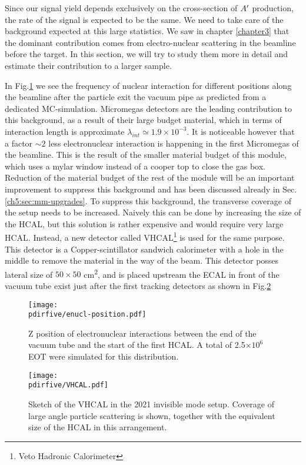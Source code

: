 Since our signal yield depends exclusively on the cross-section of $A'$ production, the rate of the signal is expected to be the same. We need to take care of the background expected at this large statistics. We saw in chapter \ref{chapter3} that the dominant contribution comes from electro-nuclear scattering in the beamline before the target. In this section, we will try to study them more in detail and estimate their contribution to a larger sample.

In Fig.\ref{fig:enucl-position} we see the frequency of nuclear interaction for different positions along the beamline after the particle exit the vacuum pipe as predicted from a dedicated MC-simulation. Micromegas detectors are the leading contribution to this background, as a result of their large budget material, which in terms of interaction length is approximate $\lambda_{int} \simeq 1.9 \times 10^{-3}$. It is noticeable however that a factor $\sim 2$ less electronuclear interaction is happening in the first Micromegas of the beamline. This is the result of the smaller material budget of this module, which uses a mylar window instead of a cooper top to close the gas box. Reduction of the material budget of the rest of the module will be an important improvement to suppress this background and has been discussed already in Sec.\ref{ch5:sec:mm-upgrades}. To suppress this background, the transverse coverage of the setup needs to be increased. Naively this can be done by increasing the size of the HCAL, but this solution is rather expensive and would require very large HCAL. Instead, a new detector called VHCAL\footnote{Veto Hadronic Calorimeter} is used for the same purpose. This detector is a Copper-scintillator sandwich calorimeter with a hole in the middle to remove the material in the way of the beam. This detector posses lateral size of $50\times50$ \si{\centi\meter\squared}, and is placed upstream the ECAL in front of the vacuum tube exist just after the first tracking detectors as shown in Fig.\ref{fig:vhcal}

\begin{figure}[bth!]
  \centering
  \texttt{[image: \\pdirfive/enucl-position.pdf]}
  \caption[electronuclear interaction position]{Z position of electronuclear interactions between the end of the vacuum tube and the start of the first HCAL. A total of 2.5$\times 10^6$ EOT were simulated for this distribution.}
  \label{fig:enucl-position}
\end{figure}

\begin{figure}[bth!]
  \centering
  \texttt{[image: \\pdirfive/VHCAL.pdf]}
  \caption[Sketch of VHCAL in invisible mode setup 2021]{Sketch of the VHCAL in the 2021 invisible mode setup. Coverage of large angle particle scattering is shown, together with the equivalent size of the HCAL in this arrangement.}
  \label{fig:vhcal}
\end{figure}

